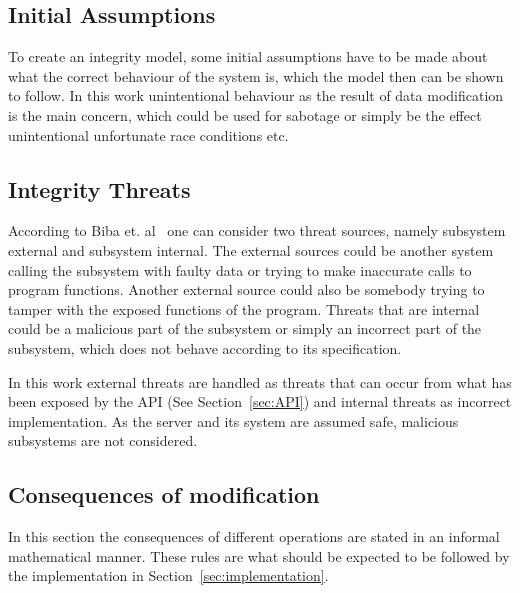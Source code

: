 \documentclass[a4paper,12pt]{article}
\begin{document}
\subsection{Initial Assumptions}
To create an integrity model, some initial assumptions have to be made about what the correct
behaviour of the system is, which the model then can be shown to follow. In this work unintentional
behaviour as the result of data modification is the main concern, which could be used for sabotage
or simply be the effect unintentional unfortunate race conditions etc. 

\subsection{Integrity Threats}
According to Biba et. al~\cite{BIBA} one can consider two threat sources, namely subsystem external
and subsystem internal. The external sources could be another system calling the subsystem with
faulty data or trying to make inaccurate calls to program functions. Another external source could
also be somebody trying to tamper with the exposed functions of the program. Threats that are
internal could be a malicious part of the subsystem or simply an incorrect part of the subsystem,
which does not behave according to its specification.

In this work external threats are handled as threats that can occur from what has been exposed by
the API (See Section~\ref{sec:API}) and internal threats as incorrect implementation. As the server
and its system are assumed safe, malicious subsystems are not considered.

\subsection{Consequences of modification} \label{sec:conseq}

In this section the consequences of different operations are stated in an informal mathematical
manner. These rules are what should be expected to be followed by the implementation in
Section~\ref{sec:implementation}. 
\end{document}
